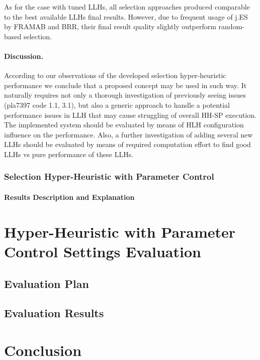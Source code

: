 As for the case with tuned LLHs, all selection approaches produced comparable to the best available LLHs final results. However, due to frequent usage of j.ES by FRAMAB and BRR, their final result quality slightly outperform random-based selection.


\paragraph{Discussion.} According to our observations of the developed selection hyper-heuristic performance we conclude that a proposed concept may be used in such way. It naturally requires not only a thorough investigation of previously seeing issues (pla7397 code 1.1, 3.1), but also a generic approach to handle a potential performance issues in LLH that may cause struggling of overall HH-SP execution. The implemented system should be evaluated by means of HLH configuration influence on the performance. Also, a further investigation of adding several new LLHs should be evaluated by means of required computation effort to find good LLHs vs pure performance of these LLHs.


\subsubsection{Selection Hyper-Heuristic with Parameter Control}

\paragraph{Results Description and Explanation}





\section{Hyper-Heuristic with Parameter Control Settings Evaluation}\label{eval: hh-pc}
\subsection{Evaluation Plan}\label{eval: hh-pc plan}
\subsection{Evaluation Results}\label{eval: hh-pc results}



\section{Conclusion}\label{eval: conclution}
